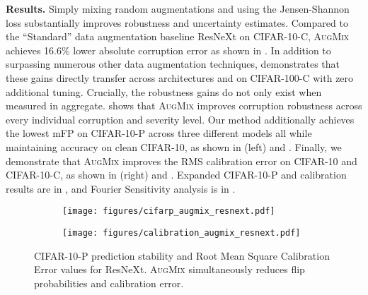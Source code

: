 \documentclass{article} \usepackage{iclr2020_conference,times}
\begin{document}
\noindent\textbf{Results.} Simply mixing random augmentations and using the Jensen-Shannon loss substantially improves robustness and uncertainty estimates. Compared to the ``Standard'' data augmentation baseline ResNeXt on CIFAR-10-C, \textsc{AugMix} achieves 16.6\% lower absolute corruption error as shown in . In addition to surpassing numerous other data augmentation techniques,  demonstrates that these gains directly transfer across architectures and on CIFAR-100-C with zero additional tuning. Crucially, the robustness gains do not only exist when measured in aggregate.  shows that \textsc{AugMix} improves corruption robustness across every individual corruption and severity level. Our method additionally achieves the lowest mFP on CIFAR-10-P across three different models all while maintaining accuracy on clean CIFAR-10, as shown in  (left) and . Finally, we demonstrate that \textsc{AugMix} improves the RMS calibration error on CIFAR-10 and CIFAR-10-C, as shown in
 (right) and . Expanded CIFAR-10-P and calibration results are in , and Fourier Sensitivity analysis is in .



\begin{figure}
\begin{subfigure}{.5\textwidth}
    \centering
    \texttt{[image: figures/cifarp\_augmix\_resnext.pdf]}
\end{subfigure}\begin{subfigure}{.5\textwidth}
    \centering
    \texttt{[image: figures/calibration\_augmix\_resnext.pdf]}
\end{subfigure}\caption{CIFAR-10-P prediction stability and Root Mean Square Calibration Error values for ResNeXt. \textsc{AugMix} simultaneously reduces flip probabilities and calibration error.
}\label{fig:pertandcalibrationcifar}
\end{figure}
\end{document}
